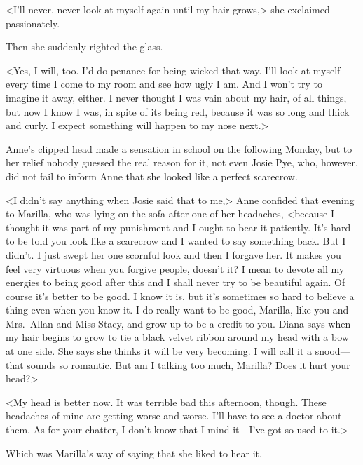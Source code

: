 <I'll never, never look at myself again until my hair grows,> she exclaimed passionately.

Then she suddenly righted the glass.

<Yes, I will, too. I'd do penance for being wicked that way. I'll look at myself every time I come to my room and see how ugly I am. And I won't try to imagine it away, either. I never thought I was vain about my hair, of all things, but now I know I was, in spite of its being red, because it was so long and thick and curly. I expect something will happen to my nose next.>

Anne's clipped head made a sensation in school on the following Monday, but to her relief nobody guessed the real reason for it, not even Josie Pye, who, however, did not fail to inform Anne that she looked like a perfect scarecrow.

<I didn't say anything when Josie said that to me,> Anne confided that evening to Marilla, who was lying on the sofa after one of her headaches, <because I thought it was part of my punishment and I ought to bear it patiently. It's hard to be told you look like a scarecrow and I wanted to say something back. But I didn't. I just swept her one scornful look and then I forgave her. It makes you feel very virtuous when you forgive people, doesn't it? I mean to devote all my energies to being good after this and I shall never try to be beautiful again. Of course it's better to be good. I know it is, but it's sometimes so hard to believe a thing even when you know it. I do really want to be good, Marilla, like you and Mrs.~Allan and Miss Stacy, and grow up to be a credit to you. Diana says when my hair begins to grow to tie a black velvet ribbon around my head with a bow at one side. She says she thinks it will be very becoming. I will call it a snood—that sounds so romantic. But am I talking too much, Marilla? Does it hurt your head?>

<My head is better now. It was terrible bad this afternoon, though. These headaches of mine are getting worse and worse. I'll have to see a doctor about them. As for your chatter, I don't know that I mind it—I've got so used to it.>

Which was Marilla's way of saying that she liked to hear it.

